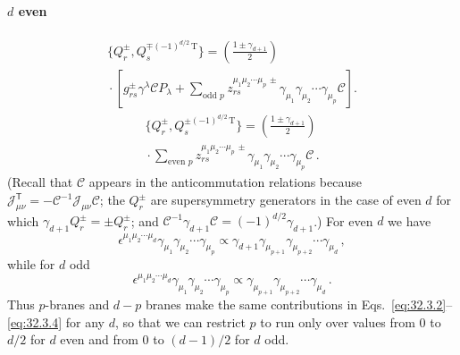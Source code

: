 \paragraph{\(d\) even}
\begin{multline}
  \{Q_r^\pm,Q_s^{\mp(-1)^{d/2}\,\mathrm T}\}
  =\left(\frac{1\pm\gamma_{d+1}}{2}\right)\\
  {}\cdot
  \left[
    g_{rs}^\pm\gamma^\lambda\mathcal C P_\lambda
    +\sum_{\text{odd }p}
      z_{rs}^{\mu_1\mu_2\cdots\mu_p\,\pm}
      \gamma_{\mu_1}\gamma_{\mu_2}\cdots\gamma_{\mu_p}\mathcal C
  \right].
  \tag{32.3.3}\label{eq:32.3.3}
\end{multline}
\begin{multline}
  \{Q_r^\pm,Q_s^{\pm(-1)^{d/2}\,\mathrm T}\}
  =\left(\frac{1\pm\gamma_{d+1}}{2}\right)\\
  {}\cdot
    \sum_{\text{even }p}
      z_{rs}^{\mu_1\mu_2\cdots\mu_p\,\pm}
      \gamma_{\mu_1}\gamma_{\mu_2}\cdots\gamma_{\mu_p}\mathcal C\,.
  \tag{32.3.4}\label{eq:32.3.4}
\end{multline}
(Recall that \(\mathcal C\) appears in the anticommutation relations
because
\(\mathscr J_{\mu\nu}^{\mathsf T}
=-\mathcal C^{-1}\mathscr J_{\mu\nu}\mathcal C\); the \(Q_r^\pm\) are
supersymmetry generators in the case of even \(d\) for which
\(\gamma_{d+1}Q_r^\pm=\pm Q_r^\pm\); and
\(\mathcal C^{-1}\gamma_{d+1}\mathcal C
=(-1)^{d/2}\gamma_{d+1}\).) For even \(d\) we have
\[
  \epsilon^{\mu_1\mu_2\cdots\mu_d}
  \gamma_{\mu_1}\gamma_{\mu_2}\cdots\gamma_{\mu_p}
  \mathrel{\propto}
  \gamma_{d+1}\gamma_{\mu_{p+1}}\gamma_{\mu_{p+2}}
  \cdots\gamma_{\mu_d}\,,
\]
while for \(d\) odd
\[
  \epsilon^{\mu_1\mu_2\cdots\mu_d}
  \gamma_{\mu_1}\gamma_{\mu_2}\cdots\gamma_{\mu_p}
  \mathrel{\propto}
  \gamma_{\mu_{p+1}}\gamma_{\mu_{p+2}}\cdots\gamma_{\mu_d}\,.
\]
Thus \(p\)-branes and \(d-p\) branes make the same contributions in
Eqs.~\eqref{eq:32.3.2}--\eqref{eq:32.3.4} for any \(d\), so that we can restrict \(p\) to
run only over values from 0 to \(d/2\) for \(d\) even and from 0 to
\((d-1)/2\) for \(d\) odd.

